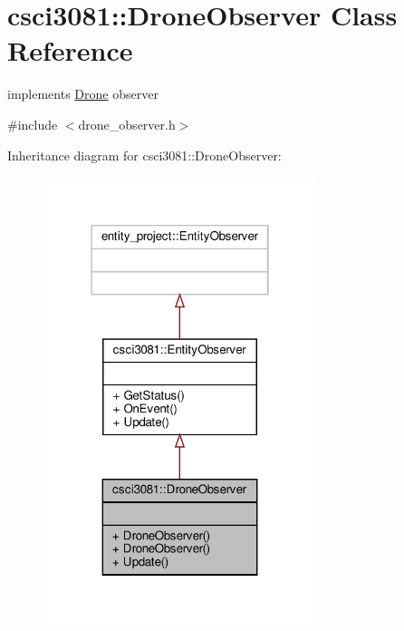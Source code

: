\hypertarget{classcsci3081_1_1DroneObserver}{}\section{csci3081\+:\+:Drone\+Observer Class Reference}
\label{classcsci3081_1_1DroneObserver}


implements \hyperlink{classcsci3081_1_1Drone}{Drone} observer  




{\ttfamily \#include $<$drone\+\_\+observer.\+h$>$}



Inheritance diagram for csci3081\+:\+:Drone\+Observer\+:\nopagebreak
\begin{figure}[H]
\begin{center}
\leavevmode
\includegraphics[width=226pt]{classcsci3081_1_1DroneObserver__inherit__graph}
\end{center}
\end{figure}


